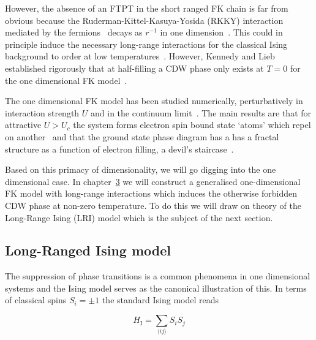 However, the absence of an FTPT in the short ranged FK chain is far from obvious because the Ruderman-Kittel-Kasuya-Yosida (RKKY) interaction mediated by the fermions~\autocite{kasuyaTheoryMetallicFerro1956,rudermanIndirectExchangeCoupling1954,vanvleckNoteInteractionsSpins1962,yosidaMagneticPropertiesCuMn1957} decays as \(r^{-1}\) in one dimension~\autocite{rusinCalculationRKKYRange2017}. This could in principle induce the necessary long-range interactions for the classical Ising background to order at low temperatures~\autocite{thoulessLongRangeOrderOneDimensional1969,peierlsIsingModelFerromagnetism1936}. However, Kennedy and Lieb established rigorously that at half-filling a CDW phase only exists at \(T = 0\) for the one dimensional FK model~\autocite{kennedyItinerantElectronModel1986}.

The one dimensional FK model has been studied numerically, perturbatively in interaction strength \(U\) and in the continuum limit~\autocite{bursillOneDimensionalContinuum1994}. The main results are that for attractive \(U > U_c\) the system forms electron spin bound state `atoms' which repel on another~\autocite{gruberGroundStateEnergyLowTemperature1993} and that the ground state phase diagram has a has a fractal structure as a function of electron filling, a devil's staircase~\autocite{freericksTwostateOnedimensionalSpinless1990,michelettiCompleteDevilStaircase1997}.

Based on this primacy of dimensionality, we will go digging into the one dimensional case. In chapter~\protect\hyperlink{chap:3-the-long-range-falicov-kimball-model}{3} we will construct a generalised one-dimensional FK model with long-range interactions which induces the otherwise forbidden CDW phase at non-zero temperature. To do this we will draw on theory of the Long-Range Ising (LRI) model which is the subject of the next section.

\hypertarget{long-ranged-ising-model}{%
\subsection{Long-Ranged Ising model}\label{long-ranged-ising-model}}

The suppression of phase transitions is a common phenomena in one dimensional systems and the Ising model serves as the canonical illustration of this. In terms of classical spins \(S_i = \pm 1\) the standard Ising model reads

\[H_{\mathrm{I}} = \sum_{\langle ij \rangle} S_i S_j\]

